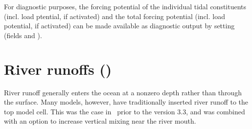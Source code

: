 \documentclass[../main/NEMO_manual]{subfiles}
\begin{document}
For diagnostic purposes, the forcing potential of the individual tidal
constituents (incl. load ptential, if activated) and the total forcing
potential (incl. load potential, if activated) can be made available
as diagnostic output by setting
 (fields
 and ).\par

\section[River runoffs (\textit{sbcrnf.F90})]{River runoffs (\protect{})}
\label{sec:SBC_rnf}

\begin{listing}
  \caption{}
  \label{lst:namsbc_rnf}
\end{listing}



River runoff generally enters the ocean at a nonzero depth rather than through the surface.
Many models, however, have traditionally inserted river runoff to the top model cell.
This was the case in \NEMO\ prior to the version 3.3,
and was combined with an option to increase vertical mixing near the river mouth.
\end{document}
